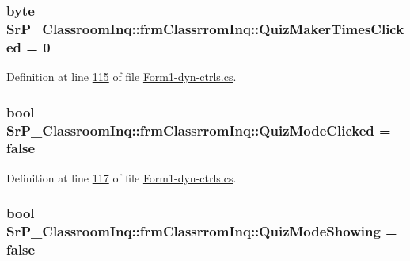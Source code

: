\hypertarget{class_sr_p___classroom_inq_1_1frm_classrrom_inq_ae28b52f195f8e33470bb7bbc988ba622}{
\subsubsection[{\-Quiz\-Maker\-Times\-Clicked}]{\setlength{\rightskip}{0pt plus 5cm}byte {\bf \-Sr\-P\-\_\-\-Classroom\-Inq\-::frm\-Classrrom\-Inq\-::\-Quiz\-Maker\-Times\-Clicked} = 0}}
\label{class_sr_p___classroom_inq_1_1frm_classrrom_inq_ae28b52f195f8e33470bb7bbc988ba622}


\-Definition at line \hyperlink{_form1-dyn-ctrls_8cs_source_l00115}{115} of file \hyperlink{_form1-dyn-ctrls_8cs_source}{\-Form1-\/dyn-\/ctrls.\-cs}.

\hypertarget{class_sr_p___classroom_inq_1_1frm_classrrom_inq_af09c14bf56f313348d1e4a533fe515bf}{
\subsubsection[{\-Quiz\-Mode\-Clicked}]{\setlength{\rightskip}{0pt plus 5cm}bool {\bf \-Sr\-P\-\_\-\-Classroom\-Inq\-::frm\-Classrrom\-Inq\-::\-Quiz\-Mode\-Clicked} = false}}
\label{class_sr_p___classroom_inq_1_1frm_classrrom_inq_af09c14bf56f313348d1e4a533fe515bf}


\-Definition at line \hyperlink{_form1-dyn-ctrls_8cs_source_l00117}{117} of file \hyperlink{_form1-dyn-ctrls_8cs_source}{\-Form1-\/dyn-\/ctrls.\-cs}.

\hypertarget{class_sr_p___classroom_inq_1_1frm_classrrom_inq_a2be9d2ea6cc1cabf0dc6c6f3ee2544ce}{
\subsubsection[{\-Quiz\-Mode\-Showing}]{\setlength{\rightskip}{0pt plus 5cm}bool {\bf \-Sr\-P\-\_\-\-Classroom\-Inq\-::frm\-Classrrom\-Inq\-::\-Quiz\-Mode\-Showing} = false}}
\label{class_sr_p___classroom_inq_1_1frm_classrrom_inq_a2be9d2ea6cc1cabf0dc6c6f3ee2544ce}


